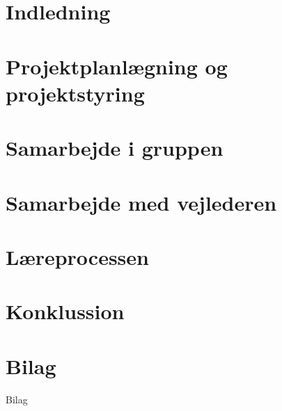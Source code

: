 \documentclass[12pt,a4paper]{report}
\begin{document}
\setcounter{page}{2}

\begin{titlepage}

\thispagestyle{empty}
\end{titlepage}


\tableofcontents
\thispagestyle{empty}

\renewcommand{\chaptername}{Kapitel}

\chapter{Indledning}
\setcounter{page}{3}
	

\chapter{Projektplanlægning og projektstyring}
\label{projektplan}
 
    


\chapter{Samarbejde i gruppen}
 
    


\chapter{Samarbejde med vejlederen}
 
    


\chapter{Læreprocessen}
 
    


\chapter{Konklussion}
 
    

\chapter*{Bilag}
 {Bilag}
\end{document}
